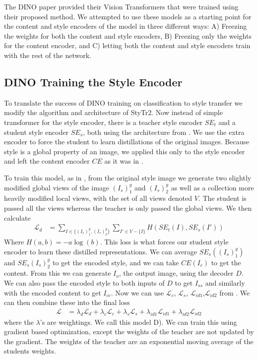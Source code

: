 \documentclass{article}
\begin{document}
The DINO paper provided their Vision Transformers that were trained using their proposed method. We attempted to use these models as a starting point for the content and style encoders of the model in three different ways: A) Freezing the weights for both the content and style encoders, B) Freezing only the weights for the content encoder, and C) letting both the content and style encoders train with the rest of the network.

\subsection{DINO Training the Style Encoder}

To translate the success of DINO training on classification to style transfer we modify the algorithm and architecture of StyTr2. Now instead of simple transformer for the style encoder, there is a teacher style encoder $SE_t$ and a student style encoder $SE_s$, both using the architecture from \cite{ImageStyleTransformer}. We use the extra encoder to force the student to learn distillations of the original images. Because style is a global property of an image, we applied this only to the style encoder and left the content encoder $CE$ as it was in \cite{ImageStyleTransformer}. 

To train this model, as in \cite{DINO}, from the original style image we generate two slightly modified global views of the image $(I_s)^g_1$ and $(I_s)^g_2$ as well as a collection more heavily modified local views, with the set of all views denoted $V$. The student is passed all the views whereas the teacher is only passed the global views. We then calculate 
\begin{align}
	\mathcal L_d &= \sum_{I \in \{(I_s)^g_1, (I_s)^g_2\}} \sum_{I' \in V - \{ I \}} H(SE_t(I), SE_s(I'))
\end{align} 
Where $H(a,b) = -a \log (b)$. This loss is what forces our student style encoder to learn these distilled representations. We can average $SE_s((I_s)^g_1)$ and $SE_s(I_s)^g_2$ to get the encoded style, and we can take $CE(I_c)$ to get the content. From this we can generate $I_o$, the output image, using the decoder $D$. We can also pass the encoded style to both inputs of $D$ to get $I_{ss}$ and similarly with the encoded content to get $I_{cc}$. Now we can use $\mathcal L_c$, $\mathcal L_s$, $\mathcal L_{id1}$,$\mathcal L_{id2}$ from \cite{ImageStyleTransformer}. We can then combine these into the final loss
\begin{align}
	\mathcal L &= \lambda_d \mathcal L_d + \lambda_c \mathcal L_c + \lambda_s \mathcal L_s + \lambda_{id1} \mathcal L_{id1} + \lambda_{id2} \mathcal L_{id2}
\end{align}
where the $\lambda$'s are weightings. We call this model D). We can train this using gradient based optimization, except the weights of the teacher are not updated by the gradient. The weights of the teacher are an exponential moving average of the students weights. 
\end{document}
